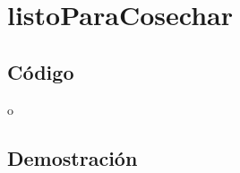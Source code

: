 \documentclass[a4paper]{article}
\begin{document}
\newpage

\section{listoParaCosechar}

    \subsection{C\'odigo}
    o

    \subsection{Demostraci\'on}
        \noindent
       
\end{document}
